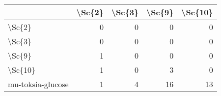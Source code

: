 \begin{tabular}{lrrrr}
\toprule
{} &  \textbackslash Sc\{2\} &  \textbackslash Sc\{3\} &  \textbackslash Sc\{9\} &  \textbackslash Sc\{10\} \\
\midrule
\textbackslash Sc\{2\}            &       0 &       0 &       0 &        0 \\
\textbackslash Sc\{3\}            &       0 &       0 &       0 &        0 \\
\textbackslash Sc\{9\}            &       1 &       0 &       0 &        0 \\
\textbackslash Sc\{10\}           &       1 &       0 &       3 &        0 \\
mu-toksia-glucose &       1 &       4 &      16 &       13 \\
\bottomrule
\end{tabular}
